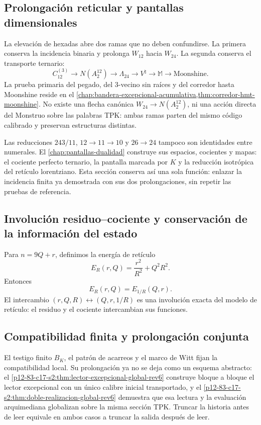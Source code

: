 \subsection{Prolongación reticular y pantallas dimensionales}

La elevación de hexadas abre dos ramas que no deben confundirse. La primera
conserva la incidencia binaria y prolonga \(W_{12}\) hacia \(W_{24}\). La
segunda conserva el transporte ternario:
\[
C_{12}^{(3)}
\longrightarrow N(A_2^{12})
\longrightarrow\Lambda_{24}
\longrightarrow V^\natural
\longrightarrow\mathbb M
\longrightarrow\text{Moonshine}.
\]
La prueba primaria del pegado, del \(3\)-vecino sin raíces y del corredor
hasta Moonshine reside en el
\cref{chap:bandera-excepcional-acumulativa,thm:corredor-hmt-moonshine}.
No existe una flecha canónica \(W_{24}\to N(A_2^{12})\), ni una acción
directa del Monstruo sobre las palabras TPK: ambas ramas parten del mismo
código calibrado y preservan estructuras distintas.

Las reducciones \(243/11\), \(12\to11\to10\) y \(26\to24\) tampoco son
identidades entre numerales. El \cref{chap:pantallas-dualidad} construye sus
espacios, cocientes y mapas: el cociente perfecto ternario, la pantalla
marcada por \(K\) y la reducción isotrópica del retículo lorentziano. Esta
sección conserva así una sola función: enlazar la incidencia finita ya
demostrada con sus dos prolongaciones, sin repetir las pruebas de referencia.

\subsection{Involución residuo–cociente y conservación de la información del estado}

Para \(n=9Q+r\), definimos la energía de retículo
\[
E_R(r,Q)=\frac{r^2}{R^2}+Q^2R^2.
\]
Entonces
\[
\boxed{E_R(r,Q)=E_{1/R}(Q,r).}
\]
El intercambio \((r,Q,R)\leftrightarrow(Q,r,1/R)\) es una involución exacta
del modelo de retículo: el residuo y el cociente intercambian sus funciones.

\subsection{Compatibilidad finita y prolongación conjunta}

El testigo finito \(B_K\), el patrón de acarreos y el marco de Witt fijan la
compatibilidad local. Su prolongación ya no se deja como un esquema
abstracto: el \cref{p12-83-c17-s2:thm:lector-excepcional-global-rev6} construye bloque a
bloque el lector excepcional con un único calibre inicial transportado, y el
\cref{p12-83-c17-s2:thm:doble-realizacion-global-rev6} demuestra que esa lectura y la
evaluación arquimediana globalizan sobre la misma sección TPK. Truncar la
historia antes de leer equivale en ambos casos a truncar la salida después de
leer.

